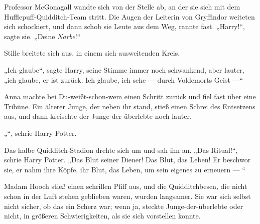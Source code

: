 Professor McGonagall wandte sich von der Stelle ab, an der sie sich mit dem Hufflepuff-Quidditch-Team stritt. Die Augen der Leiterin von Gryffindor weiteten sich schockiert, und dann schob sie Leute aus dem Weg, rannte fast.
„Harry!“, sagte sie.
„Deine \emph{Narbe}!“

Stille breitete sich aus, in einem sich ausweitenden Kreis.

„Ich glaube“, sagte Harry, seine Stimme immer noch schwankend, aber lauter, „ich glaube, er ist zurück. Ich glaube, ich sehe — durch Voldemorts Geist —“

Anna machte bei Du-weißt-schon-wem einen Schritt zurück und fiel fast über eine Tribüne. Ein älterer Junge, der neben ihr stand, stieß einen Schrei des Entsetzens aus, und dann kreischte der Junge-der-überlebte noch lauter.

„“, schrie Harry Potter.

Das halbe Quidditch-Stadion drehte sich um und sah ihn an.
„Das Ritual!“, schrie Harry Potter.
„Das Blut seiner Diener! Das Blut, das Leben! Er beschwor sie, er nahm ihre Köpfe, ihr Blut, das Leben, um sein eigenes zu erneuern — “

Madam Hooch stieß einen schrillen Pfiff aus, und die Quidditchbesen, die nicht schon in der Luft stehen geblieben waren, wurden langsamer. Sie war sich selbst nicht sicher, ob das ein Scherz war; wenn ja, steckte Junge-der-überlebte oder nicht, in größeren Schwierigkeiten, als sie sich vorstellen konnte.

